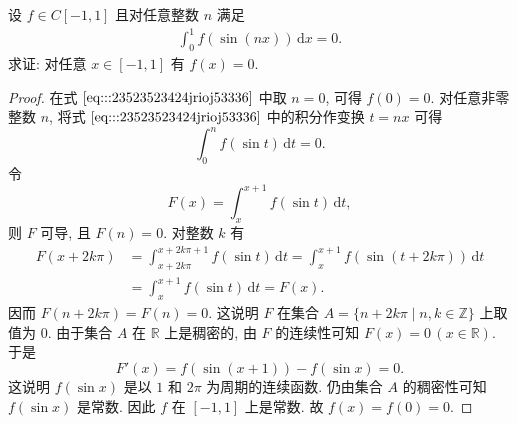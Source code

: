 \documentclass[../../main.tex]{subfiles}
\begin{document}
\begin{example}
设 \( f \in C[-1,1] \) 且对任意整数 \( n \) 满足  
\begin{align}
\int_{0}^{1} f(\sin(nx)) \, \mathrm{d}x = 0. \label{eq:::23523523424jrioj53336}
\end{align}  
求证: 对任意 \( x \in [-1,1] \) 有 \( f(x) = 0 \).  
\end{example}
\begin{proof}
在式 \(\eqref{eq:::23523523424jrioj53336}\) 中取 \( n = 0 \), 可得 \( f(0) = 0 \). 对任意非零整数 \( n \), 将式 \(\eqref{eq:::23523523424jrioj53336}\) 中的积分作变换 \( t = nx \) 可得  
\[
\int_{0}^{n} f(\sin t) \, \mathrm{d}t = 0.
\]  
令 
\[
F(x) = \int_{x}^{x + 1} f(\sin t) \, \mathrm{d}t,
\]  
则 \( F \) 可导, 且 \( F(n) = 0 \). 对整数 \( k \) 有  
\[
\begin{aligned}
F(x + 2k\pi) &= \int_{x + 2k\pi}^{x + 2k\pi + 1} f(\sin t) \, \mathrm{d}t = \int_{x}^{x + 1} f(\sin(t + 2k\pi)) \, \mathrm{d}t \\
&= \int_{x}^{x + 1} f(\sin t) \, \mathrm{d}t = F(x).
\end{aligned}
\]  
因而 \( F(n + 2k\pi) = F(n) = 0 \). 这说明 \( F \) 在集合 \( A = \{ n + 2k\pi \mid n, k \in \mathbb{Z} \} \) 上取值为 \( 0 \). 由于集合 \( A \) 在 \( \mathbb{R} \) 上是稠密的, 由 \( F \) 的连续性可知 \( F(x) = 0 \, (x \in \mathbb{R}) \). 于是  
\[
F'(x) = f(\sin(x + 1)) - f(\sin x) = 0.
\]  
这说明 \( f(\sin x) \) 是以 \( 1 \) 和 \( 2\pi \) 为周期的连续函数. 仍由集合 \( A \) 的稠密性可知 \( f(\sin x) \) 是常数. 因此 \( f \) 在 \( [-1,1] \) 上是常数. 故 \( f(x) = f(0) = 0 \).

\end{proof}
\end{document}
